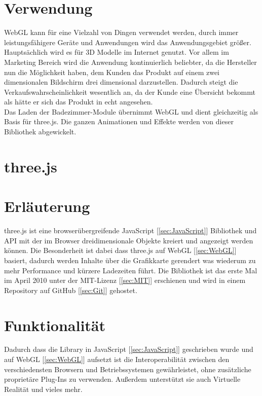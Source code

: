 \section*{Verwendung}
WebGL kann für eine Vielzahl von Dingen verwendet werden, durch immer leistungsfähigere Geräte und Anwendungen wird das Anwendungsgebiet größer. Hauptsächlich wird es für 3D Modelle im Internet genutzt. Vor allem im Marketing Bereich wird die Anwendung kontinuierlich beliebter, da die Hersteller nun die Möglichkeit haben, dem Kunden das Produkt auf einem zwei dimensionalen Bildschirm drei dimensional darzustellen. Dadurch steigt die Verkaufswahrscheinlichkeit wesentlich an, da der Kunde eine Übersicht bekommt als hätte er sich das Produkt in echt angesehen.
\\
Das Laden der Badezimmer-Module übernimmt WebGL und dient gleichzeitig als Basis für three.js. Die ganzen Animationen und Effekte werden von dieser Bibliothek abgewickelt.



\newpage
\clearpage


\section{three.js} \label{sec:three.js}
\cite{Three.js_GitHub} \cite{Three.js}
\section*{Erläuterung}
three.js ist eine browserübergreifende JavaScript [\ref{sec:JavaScript}]  Bibliothek und API mit der im Browser dreidimensionale Objekte kreiert und angezeigt werden können. Die Besonderheit ist dabei dass three.js auf WebGL [\ref{sec:WebGL}] basiert, dadurch werden Inhalte über die Grafikkarte gerendert was wiederum zu mehr Performance und kürzere Ladezeiten führt. Die Bibliothek ist das erste Mal im April 2010 unter der MIT-Lizenz [\ref{sec:MIT}] erschienen und wird in einem Repository auf GitHub [\ref{sec:Git}] gehostet.

\section*{Funktionalität}
Dadurch dass die Library in JavaScript [\ref{sec:JavaScript}]   geschrieben wurde und auf WebGL [\ref{sec:WebGL}] aufsetzt ist die Interoperabilität zwischen den verschiedensten Browsern und Betriebssystemen gewährleistet, ohne zusätzliche proprietäre Plug-Ins zu verwenden. Außerdem unterstützt sie auch Virtuelle Realität und vieles mehr.

